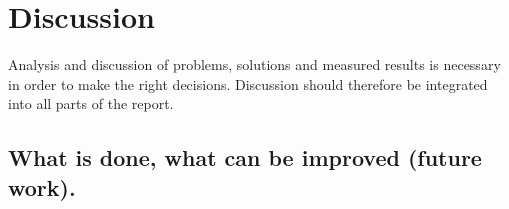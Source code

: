 \section{Discussion}
Analysis and discussion of problems, solutions and measured results is necessary in order to make the right decisions. Discussion should therefore be integrated into all parts of the report. 
\subsection{What is done, what can be improved (future work).}